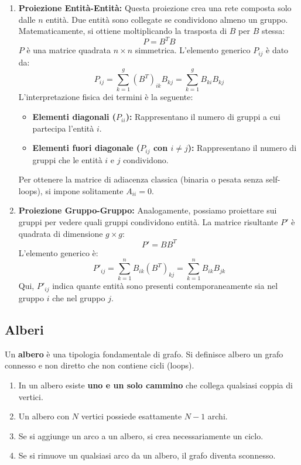 \begin{enumerate}
    \item \textbf{Proiezione Entità-Entità:}
Questa proiezione crea una rete composta solo dalle $n$ entità. Due entità sono collegate se condividono almeno un gruppo.
Matematicamente, si ottiene moltiplicando la trasposta di $B$ per $B$ stessa:
\begin{equation}
P = B^T B
\end{equation}
$P$ è una matrice quadrata $n \times n$ simmetrica. L'elemento generico $P_{ij}$ è dato da:
\begin{equation}
P_{ij} = \sum_{k=1}^g (B^T)_{ik} B_{kj} = \sum_{k=1}^g B_{ki} B_{kj}
\end{equation}
L'interpretazione fisica dei termini è la seguente:
\begin{itemize}
    \item \textbf{Elementi diagonali ($P_{ii}$):} Rappresentano il numero di gruppi a cui partecipa l'entità $i$.
    \item \textbf{Elementi fuori diagonale ($P_{ij}$ con $i \neq j$):} Rappresentano il numero di gruppi che le entità $i$ e $j$ condividono.
\end{itemize}
Per ottenere la matrice di adiacenza classica (binaria o pesata senza self-loops), si impone solitamente $A_{ii} = 0$.
\item \textbf{Proiezione Gruppo-Gruppo:}
Analogamente, possiamo proiettare sui gruppi per vedere quali gruppi condividono entità.
La matrice risultante $P'$ è quadrata di dimensione $g \times g$:
\begin{equation}
P' = B B^T
\end{equation}
L'elemento generico è:
\begin{equation}
P'_{ij} = \sum_{k=1}^n B_{ik} (B^T)_{kj} = \sum_{k=1}^n B_{ik} B_{jk}
\end{equation}
Qui, $P'_{ij}$ indica quante entità sono presenti contemporaneamente sia nel gruppo $i$ che nel gruppo $j$.
\end{enumerate}




\subsection{Alberi}
Un \textbf{albero} è una tipologia fondamentale di grafo. Si definisce albero un grafo connesso e non diretto che non contiene cicli (loops).
\begin{enumerate}
    \item In un albero esiste \textbf{uno e un solo cammino} che collega qualsiasi coppia di vertici.
    \item Un albero con $N$ vertici possiede esattamente $N-1$ archi.
    \item Se si aggiunge un arco a un albero, si crea necessariamente un ciclo.
    \item Se si rimuove un qualsiasi arco da un albero, il grafo diventa sconnesso.
\end{enumerate}

